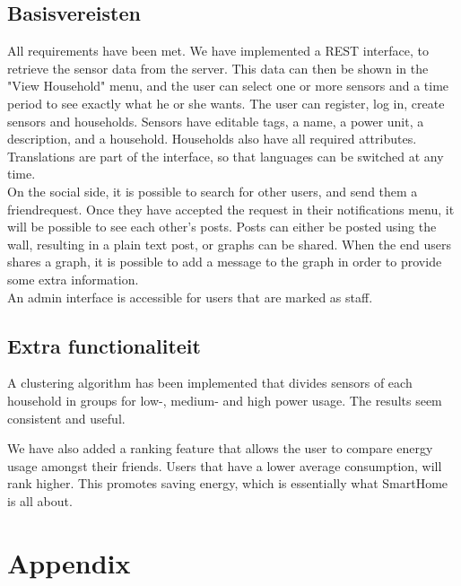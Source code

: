 \documentclass[11pt]{article}
\begin{document}
  \subsection{Basisvereisten}
	All requirements have been met. We have implemented a REST interface, to retrieve the sensor data from the server.
	This data can then be shown in the "View Household" menu, and the user can select one or more sensors and a time period to see exactly what he or she wants.
	The user can register, log in, create sensors and households. Sensors have editable tags, a name, a power unit, a description, and a household.
	Households also have all required attributes.\\

	Translations are part of the interface, so that languages can be switched at any time.\\

	On the social side, it is possible to search for other users, and send them a friendrequest.
	Once they have accepted the request in their notifications menu, it will be possible to see each other's posts.
	Posts can either be posted using the wall, resulting in a plain text post, or graphs can be shared.
	When the end users shares a graph, it is possible to add a message to the graph in order to provide some extra information.\\

	An admin interface is accessible for users that are marked as staff.\\

  \subsection{Extra functionaliteit}
	A clustering algorithm has been implemented that divides sensors of each household in groups for low-, medium- and high power usage. The results seem consistent and useful.

	We have also added a ranking feature that allows the user to compare energy usage amongst their friends.
	Users that have a lower average consumption, will rank higher. This promotes saving energy, which is essentially what SmartHome is all about.

\section{Appendix}
\end{document}
